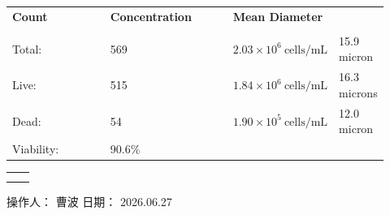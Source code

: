 \documentclass[UTF8,10pt,a4paper,fontset=fandol]{ctexart}
\newcommand{\fieldvalue}[1]{#1}
\newcommand{\handwritten}[1]{#1}
\begin{document}
\noindent
\begin{tabular}{@{}p{0.29\linewidth}p{0.34\linewidth}p{0.29\linewidth}@{}}
\textbf{Count} & \textbf{Concentration} & \textbf{Mean Diameter} \\[-2pt]
\underline{\hspace{0.22\linewidth}} &
\underline{\hspace{0.27\linewidth}} &
\underline{\hspace{0.22\linewidth}} \\[2pt]
Total: &
\fieldvalue{569}
&
\fieldvalue{$2.03\times10^6\ \mathrm{cells/mL}$}
&
\fieldvalue{15.9 micron}
\\[3pt]
Live: &
\fieldvalue{515}
&
\fieldvalue{$1.84\times10^6\ \mathrm{cells/mL}$}
&
\fieldvalue{16.3 microns}
\\[3pt]
Dead: &
\fieldvalue{54}
&
\fieldvalue{$1.90\times10^5\ \mathrm{cells/mL}$}
&
\fieldvalue{12.0 micron}
\\[3pt]
Viability: &
\fieldvalue{90.6\%}
&
&
\end{tabular}

\vspace{1.2em}

\noindent
\begin{tabular}{@{}cc@{}}
\fbox{\rule{0pt}{0.27\textheight}\rule{0.40\linewidth}{0pt}}
&
\fbox{\rule{0pt}{0.27\textheight}\rule{0.40\linewidth}{0pt}}
\\[1em]
\fbox{\rule{0pt}{0.27\textheight}\rule{0.40\linewidth}{0pt}}
&
\fbox{\rule{0pt}{0.27\textheight}\rule{0.40\linewidth}{0pt}}
\end{tabular}

\vfill

\noindent
操作人：
\fieldvalue{\handwritten{曹波}}
\hfill
日期：
\fieldvalue{\handwritten{2026.06.27}}
\end{document}
